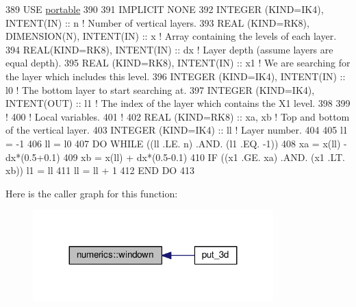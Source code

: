 \begin{DoxyCode}
389 \textcolor{keywordtype}{USE }\hyperlink{namespaceportable}{portable}
390 
391 \textcolor{keywordtype}{IMPLICIT NONE}
392 \textcolor{keywordtype}{INTEGER (KIND=IK4)}, \textcolor{keywordtype}{INTENT(IN)}                  :: n        \textcolor{comment}{! Number of vertical layers.}
393 \textcolor{keywordtype}{REAL (KIND=RK8)}, \textcolor{keywordtype}{DIMENSION(N)}, \textcolor{keywordtype}{INTENT(IN)}       :: x        \textcolor{comment}{! Array containing the levels of each layer.}
394 \textcolor{keywordtype}{REAL(KIND=RK8)}, \textcolor{keywordtype}{INTENT(IN)}                      :: dx       \textcolor{comment}{! Layer depth (assume layers are equal depth).}
395 \textcolor{keywordtype}{REAL (KIND=RK8)}, \textcolor{keywordtype}{INTENT(IN)}                     :: x1       \textcolor{comment}{! We are searching for the layer which includes
       this level.}
396 \textcolor{keywordtype}{INTEGER (KIND=IK4)}, \textcolor{keywordtype}{INTENT(IN)}                  :: l0       \textcolor{comment}{! The bottom layer to start searching at.}
397 \textcolor{keywordtype}{INTEGER (KIND=IK4)}, \textcolor{keywordtype}{INTENT(OUT)}                 :: l1       \textcolor{comment}{! The index of the layer which contains the X1
       level.}
398 
399 \textcolor{comment}{!}
400 \textcolor{comment}{! Local variables.}
401 \textcolor{comment}{!}
402 \textcolor{keywordtype}{REAL (KIND=RK8)}                                 :: xa, xb   \textcolor{comment}{! Top and bottom of the vertical layer.}
403 \textcolor{keywordtype}{INTEGER (KIND=IK4)}                              :: ll       \textcolor{comment}{! Layer number.}
404 
405 l1      = -1
406 ll      = l0
407 \textcolor{keywordflow}{DO} \textcolor{keywordflow}{WHILE} ((ll .LE. n) .AND. (l1 .EQ. -1))
408     xa  = x(ll) - dx*(0.5+0.1)
409     xb  = x(ll) + dx*(0.5-0.1)
410     \textcolor{keywordflow}{IF} ((x1 .GE. xa) .AND. (x1 .LT. xb)) l1 = ll
411     ll  = ll + 1
412 \textcolor{keywordflow}{END DO}
413 
\end{DoxyCode}


Here is the caller graph for this function\+:\nopagebreak
\begin{figure}[H]
\begin{center}
\leavevmode
\includegraphics[width=263pt]{namespacenumerics_aa16b459eac85058fd1da1b9ebc4555b9_icgraph}
\end{center}
\end{figure}


